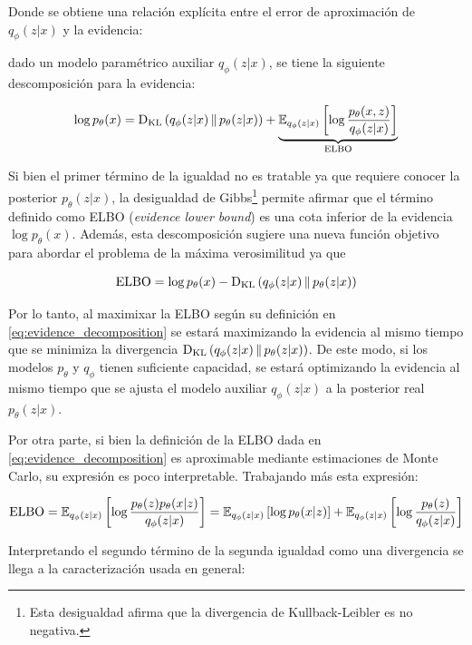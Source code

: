Donde se obtiene una relación explícita entre el error de aproximación de $q_\phi(z|x)$ y la evidencia:

\begin{prop}
    dado un modelo paramétrico auxiliar $q_\phi(z|x)$, se tiene la siguiente descomposición para la evidencia:

    \begin{equation}
        \label{eq:evidence_decomposition}
        \log p_\theta(x)
        = \operatorname{D_{KL}}\left(q_\phi(z|x)\,\|\,p_\theta(z|x)\right) + \underbrace{\mathbb{E}_{q_\phi(z|x)}\left[\log\frac{p_\theta(x,z)}{q_\phi(z|x)}\right]}_{\operatorname{ELBO}}
    \end{equation}
\end{prop}

Si bien el primer término de la igualdad no es tratable ya que requiere conocer la posterior $p_\theta(z|x)$, la desigualdad de Gibbs\footnote{Esta desigualdad afirma que la divergencia de Kullback-Leibler es no negativa.} permite afirmar que el término definido como ELBO (\textit{evidence lower bound}) es una cota inferior de la evidencia $\log p_\theta(x)$. Además, esta descomposición sugiere una nueva función objetivo para abordar el problema de la máxima verosimilitud ya que

\begin{equation}
    \label{eq:elbo}
    \operatorname{ELBO} = \log p_\theta(x) - \operatorname{D_{KL}}\left(q_\phi(z|x)\,\|\,p_\theta(z|x)\right)
\end{equation}

Por lo tanto, al maximixar la ELBO según su definición en \eqref{eq:evidence_decomposition} se estará maximizando la evidencia al mismo tiempo que se minimiza la divergencia $\operatorname{D_{KL}}\left(q_\phi(z|x)\,\|\,p_\theta(z|x)\right)$. De este modo, si los modelos $p_\theta$ y $q_\phi$ tienen suficiente capacidad, se estará optimizando la evidencia al mismo tiempo que se ajusta el modelo auxiliar $q_\phi(z|x)$ a la posterior real $p_\theta(z|x)$.

Por otra parte, si bien la definición de la ELBO dada en \eqref{eq:evidence_decomposition} es aproximable mediante estimaciones de Monte Carlo, su expresión es poco interpretable. Trabajando más esta expresión:

\begin{equation}
    \operatorname{ELBO}
    = \mathbb{E}_{q_\phi(z|x)}\left[\log\frac{p_\theta(z)p_\theta(x|z)}{q_\phi(z|x)}\right]
    = \mathbb{E}_{q_\phi(z|x)}\left[\log p_\theta(x|z)\right] + \mathbb{E}_{q_\phi(z|x)}\left[\log\frac{p_\theta(z)}{q_\phi(z|x)}\right]
\end{equation}

Interpretando el segundo término de la segunda igualdad como una divergencia se llega a la caracterización usada en general:

